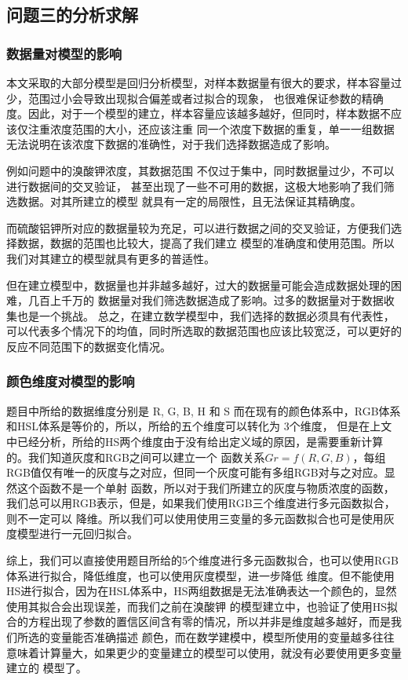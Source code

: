 \subsection{问题三的分析求解}
\subsubsection{数据量对模型的影响}
   本文采取的大部分模型是回归分析模型，对样本数据量有很大的要求，样本容量过少，范围过小会导致出现拟合偏差或者过拟合的现象，
   也很难保证参数的精确度。因此，对于一个模型的建立，样本容量应该越多越好，但同时，样本数据不应该仅注重浓度范围的大小，还应该注重
   同一个浓度下数据的重复，单一一组数据无法说明在该浓度下数据的准确性，对于我们选择数据造成了影响。
   
   例如问题中的溴酸钾浓度，其数据范围 不仅过于集中，同时数据量过少，不可以进行数据间的交叉验证，
   甚至出现了一些不可用的数据，这极大地影响了我们筛选数据。对其所建立的模型 就具有一定的局限性，且无法保证其精确度。

   而硫酸铝钾所对应的数据量较为充足，可以进行数据之间的交叉验证，方便我们选择数据，数据的范围也比较大，提高了我们建立
   模型的准确度和使用范围。所以我们对其建立的模型就具有更多的普适性。
   
   但在建立模型中，数据量也并非越多越好，过大的数据量可能会造成数据处理的困难，几百上千万的
   数据量对我们筛选数据造成了影响。过多的数据量对于数据收集也是一个挑战。
   总之，在建立数学模型中，我们选择的数据必须具有代表性，可以代表多个情况下的均值，同时所选取的数据范围也应该比较宽泛，可以更好的
   反应不同范围下的数据变化情况。

\subsubsection{颜色维度对模型的影响}
    题目中所给的数据维度分别是 R, G, B, H 和 S 而在现有的颜色体系中，RGB体系和HSL体系是等价的，所以，所给的五个维度可以转化为
    3个维度， 但是在上文中已经分析，所给的HS两个维度由于没有给出定义域的原因，是需要重新计算的。我们知道灰度和RGB之间可以建立一个
    函数关系$Gr = f(R, G, B)$，每组RGB值仅有唯一的灰度与之对应，但同一个灰度可能有多组RGB对与之对应。显然这个函数不是一个单射
    函数，所以对于我们所建立的灰度与物质浓度的函数，我们总可以用RGB表示，但是，如果我们使用RGB三个维度进行多元函数拟合，则不一定可以
    降维。所以我们可以使用使用三变量的多元函数拟合也可是使用灰度模型进行一元回归拟合。
    
    综上，我们可以直接使用题目所给的5个维度进行多元函数拟合，也可以使用RGB体系进行拟合，降低维度，也可以使用灰度模型，进一步降低
    维度。但不能使用HS进行拟合，因为在HSL体系中，HS两组数据是无法准确表达一个颜色的，显然使用其拟合会出现误差，而我们之前在溴酸钾
    的模型建立中，也验证了使用HS拟合的方程出现了参数的置信区间含有零的情况，所以并非是维度越多越好，而是我们所选的变量能否准确描述
    颜色，而在数学建模中，模型所使用的变量越多往往意味着计算量大，如果更少的变量建立的模型可以使用，就没有必要使用更多变量建立的
    模型了。
